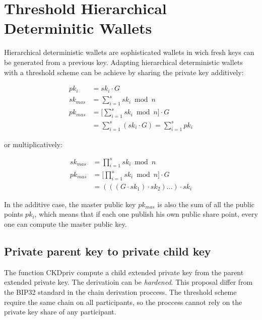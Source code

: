 \section{Threshold Hierarchical Determinitic Wallets}

Hierarchical deterministic wallets are sophisticated wallets in wich fresh keys
can be generated from a previous key. Adapting hierarchical deterministic wallets
with a threshold scheme can be achieve by sharing the private key additively:

\begin{equation*}
\begin{split}
  pk_i     &= sk_i \cdot G \\
  sk_{mas} &= \sum_{i=1}^{s} sk_i \bmod n \\
  pk_{mas} &= \Bigg[ \sum_{i=1}^{s} sk_i \bmod n \Bigg] \cdot G \\
           &= \sum_{i=1}^{s} (sk_i \cdot G) = \sum_{i=1}^{s} pk_i
\end{split}
\end{equation*}

or multiplicatively:

\begin{equation*}
\begin{split}
  sk_{mas} &= \prod_{i=1}^{s} sk_i \bmod n \\
  pk_{mas} &= \Bigg[ \prod_{i=1}^{s} sk_i \bmod n \Bigg] \cdot G \\
           &= (((G \cdot sk_1) \cdot sk_2) \dots )\cdot sk_i
\end{split}
\end{equation*}

In the additive case, the master public key $pk_{mas}$ is also the sum of all the
public points $pk_i$, which means that if each one publish his own public share
point, every one can compute the master public key.

\subsection{Private parent key to private child key}
The function CKDpriv compute a child extended private key from the parent extended
private key. The derivatioin can be \textit{hardened}. This proposal differ from
the BIP32 standard in the chain derivation proccess. The threshold scheme require
the same chain on all participants, so the proccess cannot rely on the private key
share of any participant.

